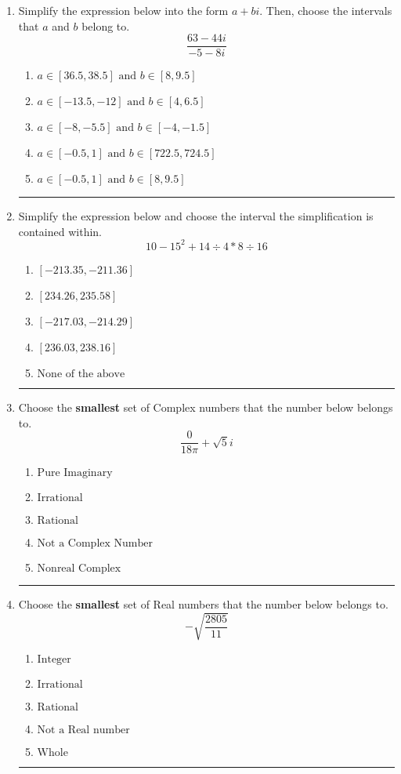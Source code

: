 \documentclass[14pt]{extbook}
\newcommand{\litem}[1]{\item#1\hspace*{-1cm}\rule{\textwidth}{0.4pt}}
\begin{document}
\begin{enumerate}
{\begin{enumerate}[label=\Alph*.]
\end{enumerate} }
\litem{
Simplify the expression below into the form $a+bi$. Then, choose the intervals that $a$ and $b$ belong to.\[ \frac{63 - 44 i}{-5 - 8 i} \]\begin{enumerate}[label=\Alph*.]
\item \( a \in [36.5, 38.5] \text{ and } b \in [8, 9.5] \)
\item \( a \in [-13.5, -12] \text{ and } b \in [4, 6.5] \)
\item \( a \in [-8, -5.5] \text{ and } b \in [-4, -1.5] \)
\item \( a \in [-0.5, 1] \text{ and } b \in [722.5, 724.5] \)
\item \( a \in [-0.5, 1] \text{ and } b \in [8, 9.5] \)

\end{enumerate} }
\litem{
Simplify the expression below and choose the interval the simplification is contained within.\[ 10 - 15^2 + 14 \div 4 * 8 \div 16 \]\begin{enumerate}[label=\Alph*.]
\item \( [-213.35, -211.36] \)
\item \( [234.26, 235.58] \)
\item \( [-217.03, -214.29] \)
\item \( [236.03, 238.16] \)
\item \( \text{None of the above} \)

\end{enumerate} }
\litem{
Choose the \textbf{smallest} set of Complex numbers that the number below belongs to.\[ \frac{0}{18 \pi}+\sqrt{5}i \]\begin{enumerate}[label=\Alph*.]
\item \( \text{Pure Imaginary} \)
\item \( \text{Irrational} \)
\item \( \text{Rational} \)
\item \( \text{Not a Complex Number} \)
\item \( \text{Nonreal Complex} \)

\end{enumerate} }
\litem{
Choose the \textbf{smallest} set of Real numbers that the number below belongs to.\[ -\sqrt{\frac{2805}{11}} \]\begin{enumerate}[label=\Alph*.]
\item \( \text{Integer} \)
\item \( \text{Irrational} \)
\item \( \text{Rational} \)
\item \( \text{Not a Real number} \)
\item \( \text{Whole} \)


\end{enumerate}}
\end{enumerate}
\end{document}
